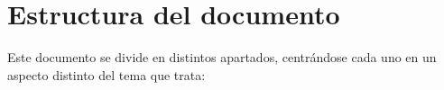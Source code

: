 %
%

\section{Estructura del documento}

Este documento se divide en distintos apartados, centrándose cada uno en un aspecto distinto del tema que trata:

